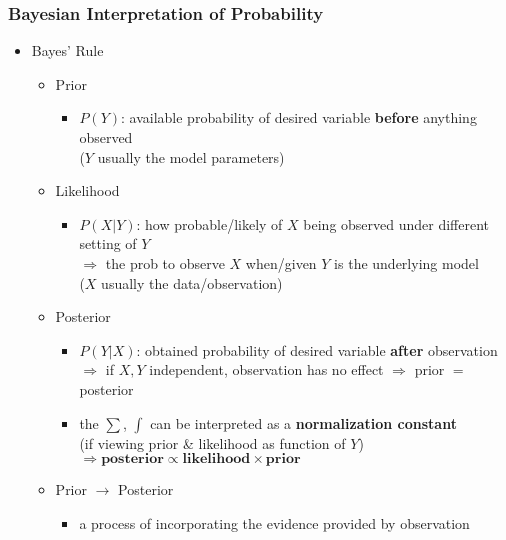 \subsubsection{Bayesian Interpretation of Probability}
\begin{itemize}
\item Bayes' Rule
	\begin{itemize}
	\item Prior
		\begin{itemize}
		\item $P(Y)$: available probability of desired variable \textbf{before} anything observed \\		
		($Y$ usually the model parameters)
		\end{itemize}
	\item Likelihood
		\begin{itemize}
		\item $P(X|Y)$: how probable/likely of $X$ being observed under different setting of $Y$ \\
		$\Rightarrow$ the prob to observe $X$ when/given $Y$ is the underlying model \\
		($X$ usually the data/observation)
		\end{itemize}
	\item Posterior
		\begin{itemize}
		\item $P(Y|X)$: obtained probability of desired variable \textbf{after} observation \\
		$\Rightarrow$ if $X,Y$ independent, observation has no effect $\Rightarrow$ prior $=$ posterior
		\item the $\sum$, $\int$ can be interpreted as a \textbf{normalization constant} \\
		(if viewing prior \& likelihood as function of $Y$)
		$\Rightarrow \textbf{posterior} \propto \textbf{likelihood} \times \textbf{prior}$
		\end{itemize}
	\item Prior $\rightarrow$ Posterior
		\begin{itemize}
		\item a process of incorporating the evidence provided by observation
		\end{itemize}
	\end{itemize}


\end{itemize}
